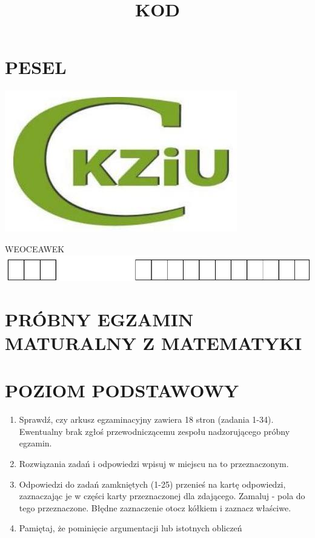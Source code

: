 \documentclass[10pt]{article}
\title{KOD }
\author{}
\date{}
\begin{document}
\maketitle
\section*{PESEL}
\begin{center}
\includegraphics[max width=\textwidth]{2024_11_21_832f1bc2b626663f1df2g-01(1)}
\end{center}

WEOCEAWEK\\
\includegraphics[max width=\textwidth, center]{2024_11_21_832f1bc2b626663f1df2g-01}

\section*{PRÓBNY EGZAMIN MATURALNY Z MATEMATYKI}
\section*{POZIOM PODSTAWOWY}
\begin{enumerate}
  \item Sprawdź, czy arkusz egzaminacyjny zawiera 18 stron (zadania 1-34). Ewentualny brak zgłoś przewodniczącemu zespołu nadzorującego próbny egzamin.
  \item Rozwiązania zadań i odpowiedzi wpisuj w miejscu na to przeznaczonym.
  \item Odpowiedzi do zadań zamkniętych (1-25) przenieś na kartę odpowiedzi, zaznaczając je w części karty przeznaczonej dla zdającego. Zamaluj - pola do tego przeznaczone. Błędne zaznaczenie otocz kółkiem i zaznacz właściwe.
  \item Pamiętaj, że pominięcie argumentacji lub istotnych obliczeń
\end{enumerate}
\end{document}
